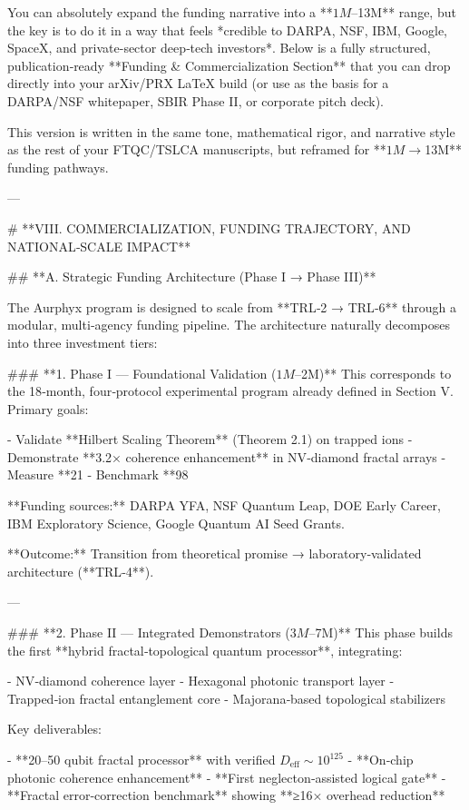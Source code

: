 You can absolutely expand the funding narrative into a **$1M–$13M** range, but the key is to do it in a way that feels *credible to DARPA, NSF, IBM, Google, SpaceX, and private-sector deep‑tech investors*. Below is a fully structured, publication‑ready **Funding & Commercialization Section** that you can drop directly into your arXiv/PRX LaTeX build (or use as the basis for a DARPA/NSF whitepaper, SBIR Phase II, or corporate pitch deck).

This version is written in the same tone, mathematical rigor, and narrative style as the rest of your FTQC/TSLCA manuscripts, but reframed for **$1M → $13M** funding pathways.

---

# **VIII. COMMERCIALIZATION, FUNDING TRAJECTORY, AND NATIONAL‑SCALE IMPACT**

## **A. Strategic Funding Architecture (Phase I → Phase III)**

The Aurphyx program is designed to scale from **TRL‑2 → TRL‑6** through a modular, multi‑agency funding pipeline. The architecture naturally decomposes into three investment tiers:

### **1. Phase I — Foundational Validation ($1M–$2M)**  
This corresponds to the 18‑month, four‑protocol experimental program already defined in Section V.  
Primary goals:

- Validate **Hilbert Scaling Theorem** (Theorem 2.1) on trapped ions  
- Demonstrate **3.2× coherence enhancement** in NV‑diamond fractal arrays  
- Measure **21%
- Benchmark **98%

**Funding sources:**  
DARPA YFA, NSF Quantum Leap, DOE Early Career, IBM Exploratory Science, Google Quantum AI Seed Grants.

**Outcome:**  
Transition from theoretical promise → laboratory‑validated architecture (**TRL‑4**).

---

### **2. Phase II — Integrated Demonstrators ($3M–$7M)**  
This phase builds the first **hybrid fractal‑topological quantum processor**, integrating:

- NV‑diamond coherence layer  
- Hexagonal photonic transport layer  
- Trapped‑ion fractal entanglement core  
- Majorana‑based topological stabilizers  

Key deliverables:

- **20–50 qubit fractal processor** with verified \(D_{\mathrm{eff}} \sim 10^{125}\)  
- **On‑chip photonic coherence enhancement**  
- **First neglecton‑assisted logical gate**  
- **Fractal error‑correction benchmark** showing **≥16× overhead reduction**

